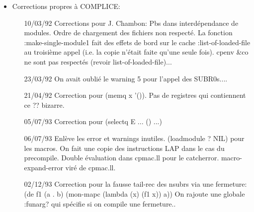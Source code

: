 \begin {itemize}
\begin{itemize}
\item Ajout de la variable {\tt \#:system:line-length-max} d\'{e}signant
la longueur maximale d'un buffer d'impression. Cette valeur est
syst\`{e}me d\'{e}pendante. On utilisera principalement {\tt
\#:system:line-length-max} avec {\tt rmargin}.

\end{itemize}
\item Corrections propres \`{a} COMPLICE:
\begin{itemize}
\item [10/03/92]
        Corrections pour J. Chambon: Pbs dans interd\'{e}pendance de modules.
         Ordre de chargement des fichiers non respect\'{e}.
         La fonction :make-single-module1 fait des effets de bord sur
          le cache :list-of-loaded-file au troisi\`{e}me appel (i.e. la
          copie n'\'{e}tait faite qu'une seule fois).
         cpenv \&co ne sont pas respect\'{e}s (revoir list-of-loaded-file)...

\item [23/03/92]
        On avait oubli\'{e} le warning 5 pour l'appel des SUBR0s....

\item [21/04/92]
        Correction pour (memq x '()).
        Pas de registres qui contiennent ce ?? bizarre.

\item [05/07/93]
        Correction pour (selectq E ... () ...)

\item [06/07/93]
        Enl\`{e}ve les error et warnings inutiles.
        (loadmodule ? NIL) pour les macros.
        On fait une copie des instructions LAP dans le cas du precompile.
        Double \'{e}valuation dans cpmac.ll pour le catcherror.
        macro-expand-error vir\'{e} de cpmac.ll.
        
\item [02/12/93]
        Correction pour la fausse tail-rec des nsubrs via une fermeture:
          (de f1 (a . b) (mon-mapc (lambda (x) (f1 x)) a))
        On rajoute une globale :funarg? qui sp\'{e}cifie si on compile une
        fermeture..


\end{itemize}
\end{itemize}
